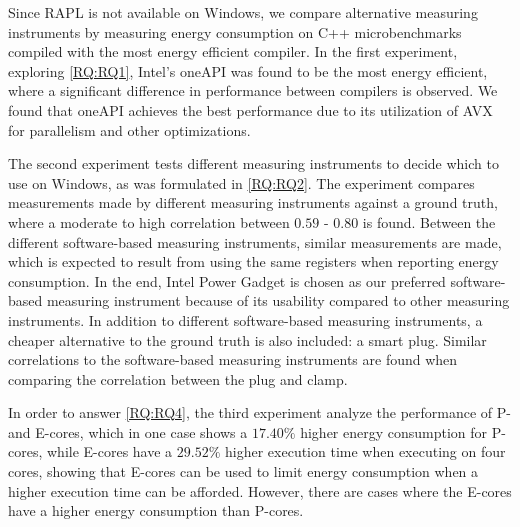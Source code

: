 Since RAPL is not available on Windows, we compare alternative measuring instruments by measuring energy consumption on C++ microbenchmarks compiled with the most energy efficient compiler. In the first experiment, exploring \cref{RQ:RQ1}, Intel's oneAPI was found to be the most energy efficient, where a significant difference in performance between compilers is observed. We found that oneAPI achieves the best performance due to its utilization of AVX for parallelism and other optimizations.


The second experiment tests different measuring instruments to decide which to use on Windows, as was formulated in \cref{RQ:RQ2}. The experiment compares measurements made by different measuring instruments against a ground truth, where a moderate to high correlation between $0.59$ - $0.80$ is found. Between the different software-based measuring instruments, similar measurements are made, which is expected to result from using the same registers when reporting energy consumption. In the end, Intel Power Gadget is chosen as our preferred software-based measuring instrument because of its usability compared to other measuring instruments. In addition to different software-based measuring instruments, a cheaper alternative to the ground truth is also included: a smart plug. Similar correlations to the software-based measuring instruments are found when comparing the correlation between the plug and clamp. %

In order to answer \cref{RQ:RQ4}, the third experiment analyze the performance of P- and E-cores, which in one case shows a $17.40\%$ higher energy consumption for P-cores, while E-cores have a $29.52\%$ higher execution time when executing on four cores, showing that E-cores can be used to limit energy consumption when a higher execution time can be afforded. However, there are cases where the E-cores have a higher energy consumption than P-cores.



